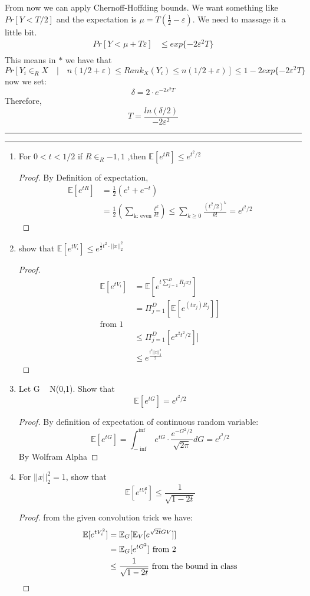 \documentclass[a4paper, 11pt]{article}
\newcommand{\question}[2] {\vspace{.25in} \hrule\vspace{0.5em}
\noindent{\bf #1: #2} \vspace{0.5em}
\hrule \vspace{.10in}}
\begin{document}
From now we can apply Chernoff-Hoffding bounds. We want something like $Pr[Y < T/2] $ and the expectation is  $\mu = T(\frac{1}{2} -\varepsilon) $. We need to massage it a little bit.
\begin{align*}
Pr[Y < \mu  + T\varepsilon] & \leq  exp\{-2\varepsilon^2 T\}\\
\end{align*}
This means in $*$ we have that 
$$Pr[ Y_i \in_R X \quad | \quad n(1/2+\varepsilon) \leq Rank_X(Y_i) \leq n(1/2+\varepsilon)] \leq 1 - 2exp\{-2\varepsilon^2 T\}$$
now we set:
$$\delta  = 2\cdot e^{-2\varepsilon^2 T} $$
Therefore, 
$$T = \frac{ln(\delta/2)}{-2\varepsilon^2}$$
\question{3}{JL}
\begin{enumerate}

\item For $0<t<1/2 $ if 	$R \in_R {-1,1}$ ,then  $\mathbb{E}[e^{tR}] \leq e^{t^2/2}$
\begin{proof}
By Definition of expectation,
\begin{align*}
\mathbb{E}[e^{tR}] &= \frac{1}{2}( e^{t} + e^{-t})\\
& =  \frac{1}{2}( \sum_{\text{k: even}}\frac{t^k}{k!}) \leq  \sum_{ k \geq 0}\frac{(t^2/2)^k}{k!} = e^{t^2/2}
\end{align*}
\end{proof}
\item show that $\mathbb{E} [e^{tV_i}] \leq e^{  \frac{1}{2} t^2 \cdot ||x||_2^2  } $
\begin{proof}
\begin{align*}
\mathbb{E} [e^{tV_i}] &= \mathbb{E} [e^{t\sum_{j=1}^D R_j xj}]\\
& = \Pi_{j=1}^D [\mathbb{E} [e^{(tx_j)R_j}]]\\
\text{from 1}\\
& \leq \Pi_{j=1}^D [e^{x^2t^2/2}]]\\
&\leq e^{ \frac{t^2 ||x||_2^2}{2}}
\end{align*}
\end{proof}
\item Let G ~ N(0,1). Show that 
$$
\mathbb{E}[e^{tG}] = e^{t^2/2}
$$
\begin{proof}
By definition of expectation of continuous  random variable:
$$
\mathbb{E}[e^{tG}] = \int_{-\inf }^{\inf} e^{tG} \cdot \frac{e^{-G^2/2}}{\sqrt{2\pi}} dG = e^{t^2/2}
$$
By Wolfram Alpha
\end{proof}
\item For $||x||_2^2 =1$, show that
$$
\mathbb{E} [e^{tV_i^2}] \leq \frac{1}{\sqrt{1-2t}}
$$
\begin{proof}
from the given convolution trick we have: 
\begin{align*}
\mathbb{E} [e^{tV_i^2}]  &= \mathbb{E}_G[ \mathbb{E}_V [e^{\sqrt{2t}GV}]]\\
& = \mathbb{E}_G[ e^{tG^2}] \textmd{ from 2}\\
&\leq \frac{1}{\sqrt{1-2t}} \textmd{ from the bound in class}
\end{align*}
\end{proof}
\end{enumerate}
\end{document}
